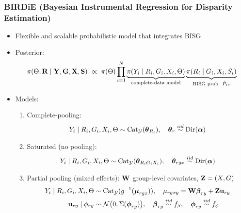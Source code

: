 \documentclass[handout]{beamer}
\newcommand{\iid}{\mathrel{\stackrel{iid}{\sim}}}
\newcommand{\Categorical}{\mathrm{Cat}}
\newcommand{\Dirichlet}{\mathrm{Dir}\qty}
\newcommand{\Norm}{\mathcal{N}\qty}
\newcommand{\cY}{\mathcal{Y}}
\begin{document}
\begin{frame}

  \frametitle{BIRDiE {\small (Bayesian Instrumental Regression for Disparity
    Estimation)}}

\begin{itemize}
\item Flexible and scalable probabilistic model that integrates BISG 

\item Posterior:
    $$\pi(\Theta, \vb R\mid \vb Y, \vb G, \vb X, \vb S)
    \ \propto \ \pi(\Theta)\prod_{i=1}^N \underbrace{\pi(Y_i\mid R_i,
      G_i, X_i, \Theta)}_{\text{complete-data model}}
            \underbrace{\pi(R_i\mid G_i, X_i, S_i)}_{\text{BISG prob. } \hat{P}_{ir}}$$
\item Models: 
  \begin{enumerate}
  \item Complete-pooling:
$$Y_i\mid R_i, G_i, X_i, \Theta \sim \Categorical_{\cY}(\vb*\theta_{R_i}), \quad
        \vb*\theta_r \iid \Dirichlet(\vb*\alpha)$$
  \item Saturated (no pooling):
$$Y_i\mid R_i, G_i, X_i, \Theta \sim \Categorical_{\cY}(\vb*\theta_{R_iG_iX_i}), \quad
        \vb*\theta_{rgx} \iid \Dirichlet(\vb*\alpha)$$
      \item Partial pooling (mixed effects): $\vb W$ group-level
        covariates, $\vb Z=(X,G)$
        \begin{align*}
    Y_i\mid R_i, G_i, X_i, \Theta &\sim
                                    \Categorical_{\cY}(g^{-1}(\vb*\mu_{rgx})), \quad
    \mu_{rgxy} = \vb W\vb*\beta_{ry} + \vb Z\vb u_{ry} \\
    \quad \vb u_{ry}\mid \phi_{ry} &\sim \Norm(0,
                                     \Sigma(\vb*\phi_{ry})), \quad
    \vb*\beta_{ry} \iid f_\beta, \quad \vb*\phi_{ry} \iid f_\phi
        \end{align*}
        \vspace{-.2in}
  \end{enumerate}

  
\end{itemize}

\end{frame}
\end{document}
